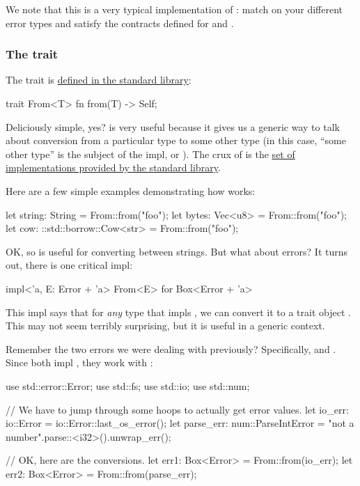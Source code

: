 We note that this is a very typical implementation of : match on your different error types and satisfy the 
contracts defined for  and .

\subsubsection*{The  trait}

The  trait is \href{https://doc.rust-lang.org/std/convert/trait.From.html}{defined in the 
standard library}:

\begin{rustc}
trait From<T> {
    fn from(T) -> Self;
}
\end{rustc}

Deliciously simple, yes?  is very useful because it gives us a generic way to talk about conversion from a 
particular type  to some other type (in this case, \enquote{some other type} is the subject of the impl, or 
). The crux of  is the \href{https://doc.rust-lang.org/std/convert/trait.From.html}{set of 
implementations provided by the standard library}.

\blank

Here are a few simple examples demonstrating how  works:

\begin{rustc}
let string: String = From::from("foo");
let bytes: Vec<u8> = From::from("foo");
let cow: ::std::borrow::Cow<str> = From::from("foo");
\end{rustc}

OK, so  is useful for converting between strings. But what about errors? It turns out, there is one critical impl:

\begin{rustc}
impl<'a, E: Error + 'a> From<E> for Box<Error + 'a>
\end{rustc}

This impl says that for \emph{any} type that impls , we can convert it to a trait object . This 
may not seem terribly surprising, but it is useful in a generic context.

\blank

Remember the two errors we were dealing with previously? Specifically,  and . Since 
both impl , they work with :

\begin{rustc}
use std::error::Error;
use std::fs;
use std::io;
use std::num;

// We have to jump through some hoops to actually get error values.
let io_err: io::Error = io::Error::last_os_error();
let parse_err: num::ParseIntError = "not a number".parse::<i32>().unwrap_err();

// OK, here are the conversions.
let err1: Box<Error> = From::from(io_err);
let err2: Box<Error> = From::from(parse_err);
\end{rustc}

